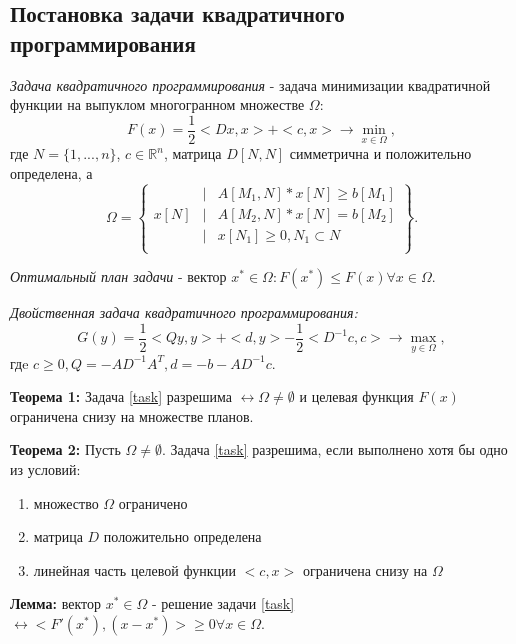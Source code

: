\documentclass[12pt,a4paper]{article}
\begin{document}
\subsection{Постановка задачи квадратичного программирования}
\textit{Задача квадратичного программирования} - задача минимизации квадратичной функции на выпуклом многогранном множестве $\Omega:$
\begin{equation}
    F(x)=\frac{1}{2}<Dx,x>+<c,x>\rightarrow\min_{x\in\Omega},
    \label{task}
\end{equation}
где $N=\{1,...,n\}$, $c\in\mathbb{R}^n$, матрица $D[N,N]$ симметрична и положительно определена, а
\begin{equation}
    \Omega=
    \left\{
    \begin{matrix}
        & | & A[M_1,N]*x[N]\geq b[M_1]\\
        x[N] & | & A[M_2,N]*x[N]=b[M_2]\\
        & | & x[N_1]\geq0,N_1\subset N\\\
    \end{matrix}
    \right\}.
\end{equation}

\textit{Оптимальный план задачи} - вектор  $x^*\in\Omega:F(x^*)\leq F(x)\forall x\in\Omega$.

\textit{Двойственная задача квадратичного программирования:}
\begin{equation}
        G(y)=\frac{1}{2}<Qy,y>+<d,y>-\frac{1}{2}<D^{-1}c,c>\rightarrow\max_{y\in\Omega},
\end{equation}
гдe $c\geq0,Q=-AD^{-1}A^T,d=-b-AD^{-1}c$.

\textbf{Теорема 1:} Задача \eqref{task} разрешима $\leftrightarrow\Omega\not=\emptyset$ и целевая функция $F(x)$ ограничена снизу на множестве планов.

\textbf{Теорема 2:} Пусть $\Omega\not=\emptyset$. Задача \eqref{task} разрешима, если выполнено хотя бы одно из условий:
\begin{enumerate}
    \item множество $\Omega$ ограничено
    \item матрица $D$ положительно определена
    \item линейная часть целевой функции $<c,x>$ ограничена снизу на $\Omega$
\end{enumerate}

\textbf{Лемма:} вектор $x^*\in\Omega$ - решение задачи \eqref{task} $\leftrightarrow<F'(x^*),(x-x^*)>\geq0\forall x\in\Omega$.
\end{document}
